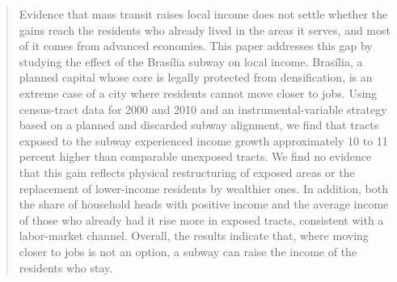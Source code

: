 \maketitle

\renewcommand{\abstractname}{Abstract}
\begin{abstract}


\noindent Evidence that mass transit raises local income does not settle whether the gains reach the residents who already lived in the areas it serves, and most of it comes from advanced economies. This paper addresses this gap by studying the effect of the Brasília subway on local income. Brasília, a planned capital whose core is legally protected from densification, is an extreme case of a city where residents cannot move closer to jobs. Using census-tract data for 2000 and 2010 and an instrumental-variable strategy based on a planned and discarded subway alignment, we find that tracts exposed to the subway experienced income growth approximately 10 to 11 percent higher than comparable unexposed tracts. We find no evidence that this gain reflects physical restructuring of exposed areas or the replacement of lower-income residents by wealthier ones. In addition, both the share of household heads with positive income and the average income of those who already had it rise more in exposed tracts, consistent with a labor-market channel. Overall, the results indicate that, where moving closer to jobs is not an option, a subway can raise the income of the residents who stay.

\noindent
\end{abstract}

\


\clearpage

\onehalfspacing
